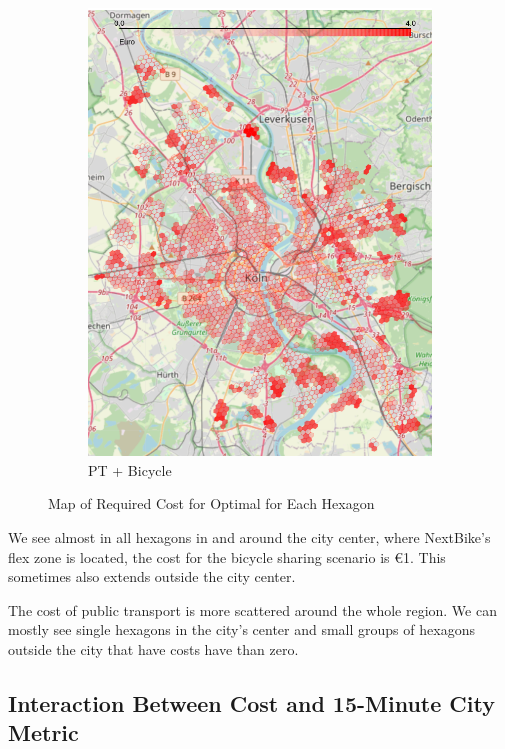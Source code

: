 \begin{figure}
\begin{subfigure}[b]{0.3\textwidth}
         \includegraphics[width=\textwidth]{Figures/results/cost/bicycle_public_transport_cost_map}
         \caption{PT + Bicycle}
         \label{fig:bicycle_public_transport_cost_map}
     \end{subfigure}
       \caption{Map of Required Cost for Optimal for Each Hexagon}
        \label{fig:cost_map_per_scenario}
\end{figure}
We see almost in all hexagons in and around the city center, where NextBike's flex zone is located, the cost for the bicycle sharing scenario is \euro{1}.
This sometimes also extends outside the city center.

The cost of public transport is more scattered around the whole region. 
We can mostly see single hexagons in the city's center and small groups of hexagons outside the city that have costs have than zero.

\subsection{Interaction Between Cost and 15-Minute City Metric}
\label{subsec:interaction_between_cost_and_15_minute_city_metric}

